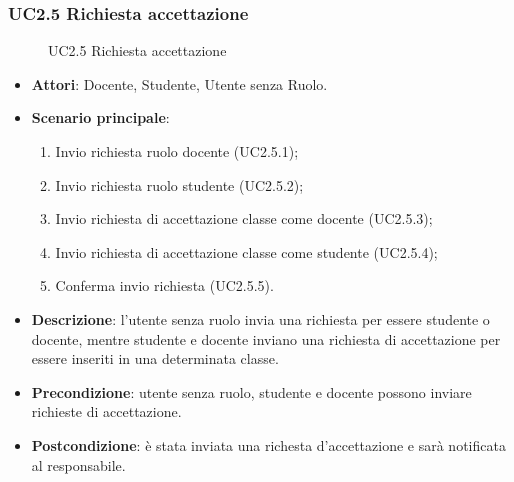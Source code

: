\subsubsection{UC2.5 Richiesta accettazione}
\begin{figure}[H]
\centering
\noindent{}
\caption{UC2.5 Richiesta accettazione}
\end{figure}
\begin{itemize}
\item \textbf{Attori}: Docente, Studente, Utente senza Ruolo.
\item \textbf{Scenario principale}:
\begin{enumerate}
\item Invio richiesta ruolo docente (UC2.5.1);
\item Invio richiesta ruolo studente (UC2.5.2);
\item Invio richiesta di accettazione classe come docente (UC2.5.3);
\item Invio richiesta di accettazione classe come studente (UC2.5.4);
\item Conferma invio richiesta (UC2.5.5).
\end{enumerate}
\item \textbf{Descrizione}: l’utente senza ruolo invia una richiesta per essere studente o docente, mentre studente e docente inviano una richiesta di accettazione per essere inseriti in una determinata classe.
\item \textbf{Precondizione}: utente senza ruolo, studente e docente possono inviare richieste di accettazione.
\item \textbf{Postcondizione}: è stata inviata una richesta d’accettazione e sarà notificata al responsabile.
\end{itemize}
